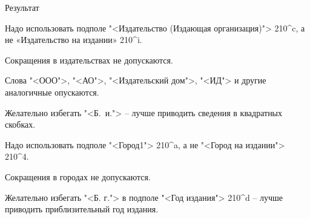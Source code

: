 \smallskip
Результат
\smallskip

\noindent{}

Надо использовать подполе "<Издательство (Издающая организация)"> 210\^{}c, а не «Издательство на издании» 210\^{}i.

Сокращения в издательствах не допускаются.

Слова "<ООО">, "<АО">, "<Издательский дом">, "<ИД"> и другие аналогичные опускаются.

Желательно избегать "<Б.~и."> -- лучше приводить сведения в квадратных скобках.

Надо использовать подполе "<Город1"> 210\^{}a, а не "<Город на издании"> 210\^{}4. 

Сокращения в городах не допускаются.

Желательно избегать "<Б. г."> в подполе "<Год издания"> 210\^{}d – лучше приводить приблизительный год издания.

